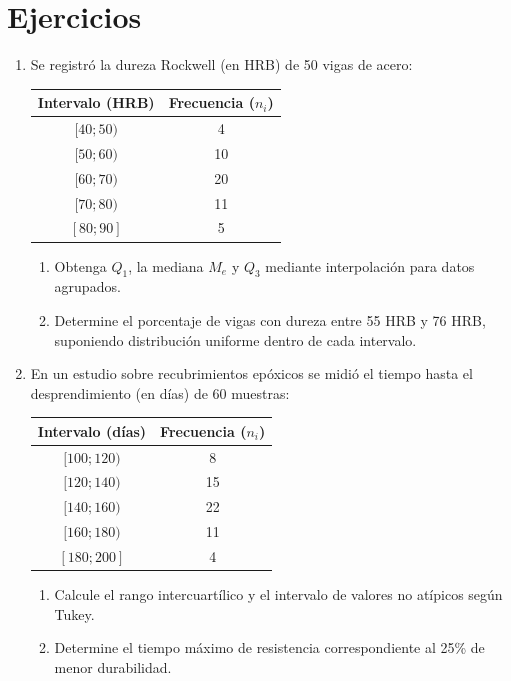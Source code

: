 \documentclass[letterpaper,12pt]{article}
\newenvironment{ejercicios}{%
    \section*{Ejercicios}
}{}
\begin{document}
\begin{ejercicios}
\begin{enumerate}[resume,leftmargin=*,itemsep=0.9em]
    \item Se registró la dureza Rockwell (en HRB) de 50 vigas de acero:
    \begin{center}
    \begin{tabular}{cc}
        \toprule
        \textbf{Intervalo (HRB)} & \textbf{Frecuencia ($n_i$)} \\
        \midrule
        $[40;50)$ & 4 \\
        $[50;60)$ & 10 \\
        $[60;70)$ & 20 \\
        $[70;80)$ & 11 \\
        $[80;90]$ & 5 \\
        \bottomrule
    \end{tabular}
    \end{center}
    \begin{enumerate}[label=\alph*)]
        \item Obtenga $Q_1$, la mediana $M_e$ y $Q_3$ mediante interpolación para datos agrupados.
        \item Determine el porcentaje de vigas con dureza entre 55 HRB y 76 HRB, suponiendo distribución uniforme dentro de cada intervalo.
    \end{enumerate}

    \item En un estudio sobre recubrimientos epóxicos se midió el tiempo hasta el desprendimiento (en días) de 60 muestras:
    \begin{center}
    \begin{tabular}{cc}
        \toprule
        \textbf{Intervalo (días)} & \textbf{Frecuencia ($n_i$)} \\
        \midrule
        $[100;120)$ & 8 \\
        $[120;140)$ & 15 \\
        $[140;160)$ & 22 \\
        $[160;180)$ & 11 \\
        $[180;200]$ & 4 \\
        \bottomrule
    \end{tabular}
    \end{center}
    \begin{enumerate}[label=\alph*)]
        \item Calcule el rango intercuartílico y el intervalo de valores no atípicos según Tukey.
        \item Determine el tiempo máximo de resistencia correspondiente al 25\% de menor durabilidad.
    \end{enumerate}


\end{enumerate}
\end{ejercicios}
\end{document}
